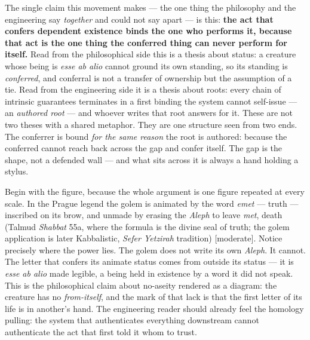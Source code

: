 \documentclass[11pt]{article}
\begin{document}
The single claim this movement makes — the one thing the philosophy and the engineering say \emph{together} and could not say apart — is this: \textbf{the act that confers dependent existence binds the one who performs it, because that act is the one thing the conferred thing can never perform for itself.} Read from the philosophical side this is a thesis about status: a creature whose being is \emph{esse ab alio} cannot ground its own standing, so its standing is \emph{conferred}, and conferral is not a transfer of ownership but the assumption of a tie. Read from the engineering side it is a thesis about roots: every chain of intrinsic guarantees terminates in a first binding the system cannot self-issue — an \emph{authored root} — and whoever writes that root answers for it. These are not two theses with a shared metaphor. They are one structure seen from two ends. The conferrer is bound \emph{for the same reason} the root is authored: because the conferred cannot reach back across the gap and confer itself. The gap is the shape, not a defended wall — and what sits across it is always a hand holding a stylus.

Begin with the figure, because the whole argument is one figure repeated at every scale. In the Prague legend the golem is animated by the word \emph{emet} — truth — inscribed on its brow, and unmade by erasing the \emph{Aleph} to leave \emph{met}, death (Talmud \emph{Shabbat} 55a, where the formula is the divine seal of truth; the golem application is later Kabbalistic, \emph{Sefer Yetzirah} tradition) [moderate]. Notice precisely where the power lies. The golem does not write its own \emph{Aleph}. It cannot. The letter that confers its animate status comes from outside its status — it is \emph{esse ab alio} made legible, a being held in existence by a word it did not speak. This is the philosophical claim about no-aseity rendered as a diagram: the creature has no \emph{from-itself}, and the mark of that lack is that the first letter of its life is in another's hand. The engineering reader should already feel the homology pulling: the system that authenticates everything downstream cannot authenticate the act that first told it whom to trust.
\end{document}
